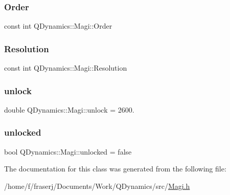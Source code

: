 \subsubsection{\texorpdfstring{Order}{Order}}
{\footnotesize\ttfamily const int Q\+Dynamics\+::\+Magi\+::\+Order\hspace{0.3cm}{\ttfamily [protected]}}

\mbox{\label{classQDynamics_1_1Magi_a629449f541590040a7dfb98ca68cf97b}} 
\subsubsection{\texorpdfstring{Resolution}{Resolution}}
{\footnotesize\ttfamily const int Q\+Dynamics\+::\+Magi\+::\+Resolution\hspace{0.3cm}{\ttfamily [protected]}}

\mbox{\label{classQDynamics_1_1Magi_a11af2e624714857cf13343f1745f2fa8}} 
\subsubsection{\texorpdfstring{unlock}{unlock}}
{\footnotesize\ttfamily double Q\+Dynamics\+::\+Magi\+::unlock = 2600.}

\mbox{\label{classQDynamics_1_1Magi_aba1aa111cd53a194854a2a8ac4b06b32}} 
\subsubsection{\texorpdfstring{unlocked}{unlocked}}
{\footnotesize\ttfamily bool Q\+Dynamics\+::\+Magi\+::unlocked = false}



The documentation for this class was generated from the following file\+:\begin{DoxyCompactItemize}
\item 
/home/f/fraserj/\+Documents/\+Work/\+Q\+Dynamics/src/\hyperlink{Magi_8h}{Magi.\+h}\end{DoxyCompactItemize}
